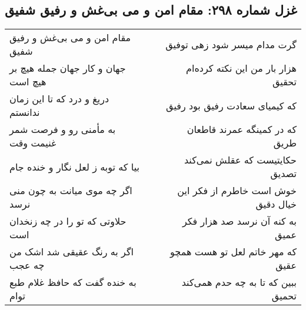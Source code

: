 \begin{center}
\section*{غزل شماره ۲۹۸: مقام امن و می بی‌غش و رفیق شفیق}
\label{sec:sh298}
\begin{longtable}{l p{0.5cm} r}
مقام امن و می بی‌غش و رفیق شفیق
&&
گرت مدام میسر شود زهی توفیق
\\
جهان و کار جهان جمله هیچ بر هیچ است
&&
هزار بار من این نکته کرده‌ام تحقیق
\\
دریغ و درد که تا این زمان ندانستم
&&
که کیمیای سعادت رفیق بود رفیق
\\
به مأمنی رو و فرصت شمر غنیمت وقت
&&
که در کمینگه عمرند قاطعان طریق
\\
بیا که توبه ز لعل نگار و خنده جام
&&
حکایتیست که عقلش نمی‌کند تصدیق
\\
اگر چه موی میانت به چون منی نرسد
&&
خوش است خاطرم از فکر این خیال دقیق
\\
حلاوتی که تو را در چه زنخدان است
&&
به کنه آن نرسد صد هزار فکر عمیق
\\
اگر به رنگ عقیقی شد اشک من چه عجب
&&
که مهر خاتم لعل تو هست همچو عقیق
\\
به خنده گفت که حافظ غلام طبع توام
&&
ببین که تا به چه حدم همی‌کند تحمیق
\\
\end{longtable}
\end{center}
